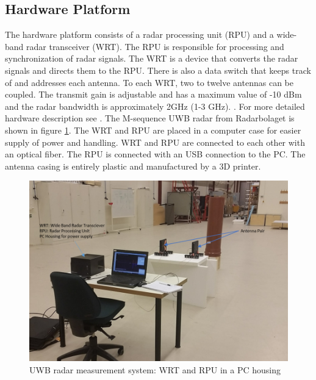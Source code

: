 \subsection{Hardware Platform}
The hardware platform consists of a radar processing unit (RPU) and a wide-band radar transceiver (WRT). The RPU is responsible for processing and synchronization of radar signals. The WRT is a device that converts the radar signals and directs them to the RPU. There is also a data switch that keeps track of and addresses each antenna. To each WRT, two to twelve antennas can be coupled. The transmit gain is adjustable and has a maximum value of -10 dBm and the radar bandwidth is approximately 2GHz (1-3 GHz). . For more detailed hardware description see \cite{Radarbolaget}. The M-sequence UWB radar from Radarbolaget is shown in figure \ref{fig:RadarPic}. The WRT and RPU are placed in a computer case for easier supply of power and handling. WRT and RPU are connected to each other with an optical fiber. The RPU is connected with an USB connection to the PC. The antenna casing is entirely plastic and manufactured by a 3D printer.  
\begin{figure}
    \centering
    \includegraphics[width=\linewidth]{Figures/RadarMeasurement.png}
    \caption{UWB radar measurement system: WRT and RPU in a PC housing}
    \label{fig:RadarPic}
\end{figure}

